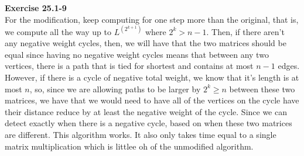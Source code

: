 \documentclass{article}
\begin{document}
\noindent\textbf{Exercise 25.1-9}\\
For the modification, keep computing for one step more than the original, that is, we compute all the way up to $L^{(2^{k+1})}$ where $2^{k} >n-1$. Then, if there aren't any negative weight cycles, then, we will have that the two matrices should be equal since having no negative weight cycles means that between any two vertices, there is a path that is tied for shortest and contains at most $n-1$ edges. However, if there is a cycle of negative total weight, we know that it's length is at most $n$, so, since we are allowing paths to be larger by $2^k\ge n$ between these two matrices, we have that we would need to have all of the vertices on the cycle have their distance reduce by at least the negative weight of the cycle. Since we can detect exactly when there is a negative cycle, based on when these two matrices are different. This algorithm works. It also only takes time equal to a single matrix multiplication which is littlee oh of the unmodified algorithm.\\
\end{document}
